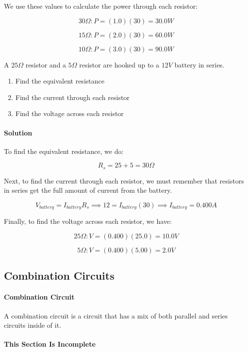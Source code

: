 \documentclass{scrartcl}
\theoremstyle{definition}
\begin{document}
	\noindent We use these values to calculate the power through each resistor:
	
	$$
	30 \Omega: P = (1.0)(30) = \boxed{30.0 W}
	$$
	
	$$
	15 \Omega: P = (2.0)(30) = \boxed{60.0 W}
	$$
	
	$$
	10 \Omega: P = (3.0)(30) = \boxed{90.0 W}
	$$
	
	\begin{example}
		A $25 \Omega$ resistor and a $5 \Omega$ resistor are hooked up to a $12V$ battery in series. 
		\begin{enumerate}
			\item Find the equivalent resistance
			\item Find the current through each resistor
			\item Find the voltage across each resistor
		\end{enumerate}
	\end{example}
	
	\paragraph{Solution} To find the equivalent resistance, we do:
	
	$$
	R_s = 25 + 5 = \boxed{30 \Omega}
	$$
	
	\noindent Next, to find the current through each resistor, we must remember that resistors in series get the full amount of current from the battery.
	
	$$
	V_{battery} = I_{battery} R_s \implies 12 = I_{battery} (30) \implies \boxed{I_{battery} = 0.400 A}
	$$
	
	\noindent Finally, to find the voltage across each resistor, we have:
	
	$$
	25 \Omega: V = (0.400)(25.0) = \boxed{10.0V} 
	$$
	
	$$
	5 \Omega: V = (0.400)(5.00) = \boxed{2.0 V}
	$$	
	
	\subsection{Combination Circuits}
	
	\paragraph{Combination Circuit} A combination circuit is a circuit that has a mix of both parallel and series circuits inside of it.

	\paragraph{This Section Is Incomplete}
	
\end{document}
